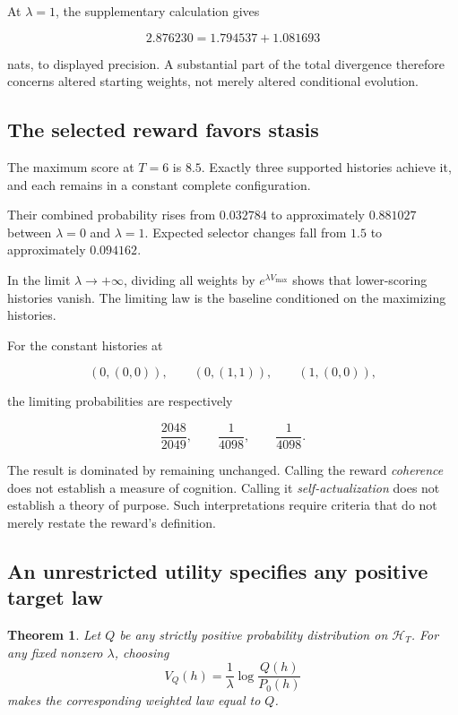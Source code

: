 \documentclass[11pt]{article}
\newtheorem{theorem}{Theorem}
\theoremstyle{remark}
\newcommand{\Hcal}{\mathcal{H}}
\begin{document}
At \(\lambda=1\), the supplementary calculation gives

\begin{equation}
2.876230
=
1.794537+1.081693
\end{equation}

nats, to displayed precision. A substantial part of the total divergence therefore concerns altered starting weights, not merely altered conditional evolution.

\subsection{The selected reward favors stasis}

The maximum score at \(T=6\) is \(8.5\). Exactly three supported histories achieve it, and each remains in a constant complete configuration.

Their combined probability rises from \(0.032784\) to approximately \(0.881027\) between \(\lambda=0\) and \(\lambda=1\). Expected selector changes fall from \(1.5\) to approximately \(0.094162\).

In the limit \(\lambda\to+\infty\), dividing all weights by \(e^{\lambda V_{\max}}\) shows that lower-scoring histories vanish. The limiting law is the baseline conditioned on the maximizing histories.

For the constant histories at

\begin{equation}
(0,(0,0)),\qquad
(0,(1,1)),\qquad
(1,(0,0)),
\end{equation}

the limiting probabilities are respectively

\begin{equation}
\frac{2048}{2049},
\qquad
\frac1{4098},
\qquad
\frac1{4098}.
\end{equation}

The result is dominated by remaining unchanged. Calling the reward \emph{coherence} does not establish a measure of cognition. Calling it \emph{self-actualization} does not establish a theory of purpose. Such interpretations require criteria that do not merely restate the reward's definition.

\subsection{An unrestricted utility specifies any positive target law}

\begin{theorem}
Let \(Q\) be any strictly positive probability distribution on \(\Hcal_T\). For any fixed nonzero \(\lambda\), choosing
\begin{equation}
V_Q(h)
=
\frac1\lambda
\log\frac{Q(h)}{P_0(h)}
\end{equation}
makes the corresponding weighted law equal to \(Q\).
\end{theorem}
\end{document}

